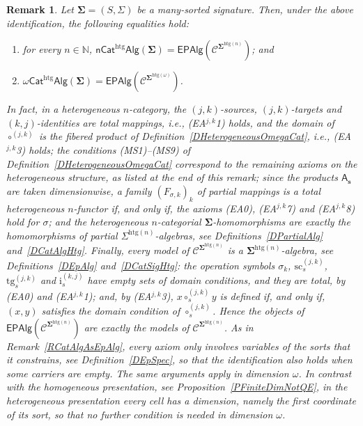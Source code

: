 \documentclass[a4paper, reqno]{amsbook}
\newcommand{\sig}[1]{\mathbf{#1}}             %
\newcommand{\spec}[1]{\boldsymbol{\mathcal{#1}}} %
\newcommand{\htg}{\mathrm{htg}}                %
\newcommand{\src}{\mathrm{sc}}
\newcommand{\tgt}{\mathrm{tg}}
\theoremstyle{plain}
\newtheorem{remark}[theorem]{Remark}
\theoremstyle{definition}
\begin{document}
\begin{remark}\label{RCatAlgAsEpAlgHtg}
Let $\sig{\Sigma}=(S,\Sigma)$ be a many-sorted signature.
Then, under the above identification, the following equalities hold:
\begin{enumerate}
	\item
	for every $n \in \mathbb{N}$, $\mathsf{nCat}^{\htg}\mathsf{Alg}(\sig{\Sigma})=\mathsf{EPAlg}(\spec{C}^{\sig{\Sigma}^{\htg(n)}})$; and

	\item
	$\omega\mathsf{Cat}^{\htg}\mathsf{Alg}(\sig{\Sigma})=\mathsf{EPAlg}(\spec{C}^{\sig{\Sigma}^{\htg(\omega)}})$.
\end{enumerate}
In fact, in a heterogeneous $n$-category, the $(j,k)$-sources, $(j,k)$-targets and $(k,j)$-identities are total mappings, i.e., (EA$^{j,k}$1) holds, and the domain of $\circ^{(j,k)}$ is the fibered product of Definition~\ref{DHeterogeneousOmegaCat}, i.e., (EA$^{j,k}$3) holds; the conditions (MS1)--(MS9) of Definition~\ref{DHeterogeneousOmegaCat} correspond to the remaining axioms on the heterogeneous structure, as listed at the end of this remark; since the products $\mathsf{A}_{\mathbf{s}}$ are taken dimensionwise, a family $(F_{\sigma,k})_{k}$ of partial mappings is a total heterogeneous $n$-functor if, and only if, the axioms (EA0), (EA$^{j,k}$7) and (EA$^{j,k}$8) hold for $\sigma$; and the heterogeneous $n$-categorial $\sig{\Sigma}$-homomorphisms are exactly the homomorphisms of partial $\Sigma^{\htg(n)}$-algebras, see Definitions~\ref{DPartialAlg} and~\ref{DCatAlgHtg}.
Finally, every model of $\spec{C}^{\sig{\Sigma}^{\htg(n)}}$ is a $\sig{\Sigma}^{\htg(n)}$-algebra, see Definitions~\ref{DEpAlg} and~\ref{DCatSigHtg}: the operation symbols $\sigma_{k}$, $\src^{(j,k)}_{s}$, $\tgt^{(j,k)}_{s}$ and $\mathrm{i}^{(k,j)}_{s}$ have empty sets of domain conditions, and they are total, by (EA0) and (EA$^{j,k}$1); and, by (EA$^{j,k}$3), $x\circ^{(j,k)}_{s}y$ is defined if, and only if, $(x,y)$ satisfies the domain condition of $\circ^{(j,k)}_{s}$.
Hence the objects of $\mathsf{EPAlg}(\spec{C}^{\sig{\Sigma}^{\htg(n)}})$ are exactly the models of $\spec{C}^{\sig{\Sigma}^{\htg(n)}}$.
As in Remark~\ref{RCatAlgAsEpAlg}, every axiom only involves variables of the sorts that it constrains, see Definition~\ref{DEpSpec}, so that the identification also holds when some carriers are empty.
The same arguments apply in dimension $\omega$.
In contrast with the homogeneous presentation, see Proposition~\ref{PFiniteDimNotQE}, in the heterogeneous presentation every cell has a dimension, namely the first coordinate of its sort, so that no further condition is needed in dimension $\omega$.

\end{remark}
\end{document}
